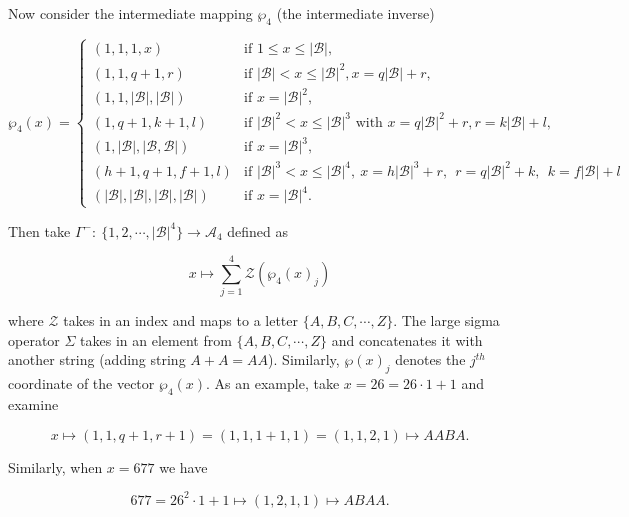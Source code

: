 \documentclass[amsmath,12pt,a4paper]{amsart}
\begin{document}
Now consider the intermediate mapping $ \wp_4$ (the intermediate inverse)

\begin{equation}\label{Eq30}
\wp_4(x) =
\begin{cases}
(1, 1, 1, x) & \text{if } 1 \leq x \leq |\mathcal{B}|, \\
(1, 1, q+1, r) & \text{if } |\mathcal{B}| < x \leq |\mathcal{B}|^2, x = q|\mathcal{B}| + r, \\
(1, 1, |\mathcal{B}|, |\mathcal{B}|) & \text{if } x = |\mathcal{B}|^2, \\
(1, q+1, k+1, l) & \text{if  $|\mathcal{B}|^2 < x \leq |\mathcal{B}|^3$ with $x = q|\mathcal{B}|^2 + r,  r = k|\mathcal{B}| + l$}, \\
 (1, |\mathcal{B}|, |\mathcal{B}, \mathcal{B}|) & \text{if  $x = |\mathcal{B}|^3$}, \\
(h+1, q+1, f+1, l) & \text{if  $|\mathcal{B}|^3 < x \leq |\mathcal{B}|^4, \ x = h|\mathcal{B}|^3 + r,~~ r = q|\mathcal{B}|^2 + k,~~ k = f|\mathcal{B}| + l$} \\
(|\mathcal{B}|, |\mathcal{B}|, |\mathcal{B}|, |\mathcal{B}|) & \text{if $x = |\mathcal{B}|^4$}.
\end{cases}
\end{equation}

Then take $\Gamma^-:~\{1,2,\cdots, |\mathcal{B}|^4\}\rightarrow \mathcal{A}_4$ defined as 

\begin{equation}\label{Eq31}
x\mapsto \sum_{j=1}^{4}{\mathcal{Z}(\wp_4(x)_j)}
\end{equation}

where $\mathcal{Z}$ takes in an index and maps to a letter $\{A,B,C,\cdots,Z\}$. The large sigma operator $\Sigma$ takes in an  element from $\{A,B,C,\cdots,Z\}$ and concatenates it with another string (adding string $A+A = AA$). Similarly, $\wp(x)_j$ denotes the $j^{th}$ coordinate of the vector $\wp_4(x)$. As an example, take $x=26=26\cdot 1+1$ and examine 

\begin{equation}\label{Eq32}
x\mapsto (1,1,q+1,r+1)= (1,1,1+1,1) = (1,1,2,1) \mapsto AABA.
\end{equation}

Similarly, when $x=677$ we have 
  
  \begin{equation}\label{Eq33}
  677 = 26^2\cdot 1+1 \mapsto (1,2,1,1) \mapsto ABAA . 
  \end{equation}
  
\end{document}
